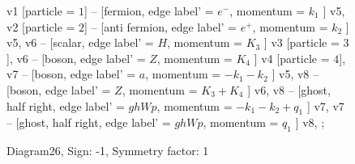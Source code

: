 \documentclass{revtex4}
\begin{document}
\begin{figure}[!htb]
\begin{center}
{    %
v1 [particle = \(1\)] -- [fermion, edge label' = \(e^{-}\), momentum = \(k_{1}\) ] v5, 
v2 [particle = \(2\)] -- [anti fermion, edge label' = \(e^{+}\), momentum = \(k_{2}\) ] v5, 
v6 -- [scalar, edge label' = \(H\), momentum = \(K_{3}\) ] v3 [particle = \(3\)], 
v6 -- [boson, edge label' = \(Z\), momentum = \(K_{4}\) ] v4 [particle = \(4\)], 
v7 -- [boson, edge label' = \(a\), momentum = \(-k_{1} - k_{2}\) ] v5, 
v8 -- [boson, edge label' = \(Z\), momentum = \(K_{3} + K_{4}\) ] v6, 
v8 -- [ghost, half right, edge label' = \(ghWp\), momentum = \(-k_{1} - k_{2} + q_{1}\) ] v7, 
v7 -- [ghost, half right, edge label' = \(ghWp\), momentum = \(q_{1}\) ] v8, 
};
\end{center}
\caption{Diagram26, Sign: -1, Symmetry factor: 1}
\end{figure}
\newpage
\end{document}
